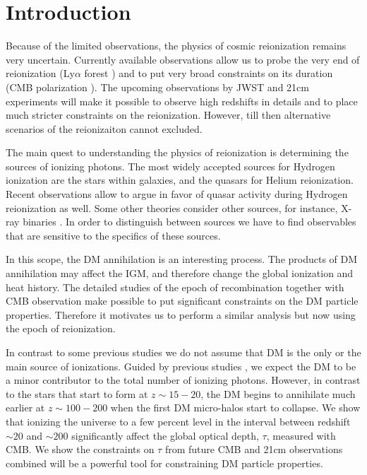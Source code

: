 \section{Introduction}

Because of the limited observations, the physics of cosmic reionization remains very uncertain. Currently available observations allow us to probe the very end of reionization (Ly$\alpha$ forest \citet{Becker_2015}) and to put very broad constraints on its duration (CMB polarization \citet{Zahn_2012}). The upcoming observations by JWST and 21cm experiments will make it possible to observe high redshifts in details and to place much stricter constraints on the reionization. However, till then alternative scenarios of the reionizaiton cannot excluded.

The main quest to understanding the physics of reionization is determining the sources of ionizing photons. The most widely accepted sources for Hydrogen ionization are the stars within galaxies, and the quasars for Helium reionization. Recent observations allow \cite{2015arXiv150707678M} to argue in favor of quasar activity during Hydrogen reionization as well. Some other theories consider other sources, for instance, X-ray binaries \cite{Fialkov_2014}. In order to distinguish between sources we have to find observables that are sensitive to the specifics of these sources.

In this scope, the DM annihilation is an interesting process. The products of DM annihilation may affect the IGM, and therefore change the global ionization and heat history. The detailed studies of the epoch of recombination \citet{2015arXiv150603811S} together with CMB observation \cite{2015arXiv150201589P} make possible to put significant constraints on the DM particle properties. Therefore it motivates us to perform a similar analysis but now using the epoch of reionization. 

In contrast to some previous studies \cite{2009JCAP...10..009C, 2009PhRvD..80c5007B} we do not assume that DM is the only or the main source of ionizations. Guided by previous studies \cite{H_tsi_2009}, we expect the DM to be a minor contributor to the total number of ionizing photons. However, in contrast to the stars that start to form at $z\sim 15-20$, the DM begins to annihilate much earlier at $z\sim100-200$ when the first DM micro-halos start to collapse. We show that ionizing the universe to a few percent level in the interval between redshift $\sim20$ and $\sim200$ significantly affect the global optical depth, $\tau$, measured with CMB. We show the constraints on $\tau$ from future CMB and 21cm observations combined will be a powerful tool for constraining DM particle properties.

